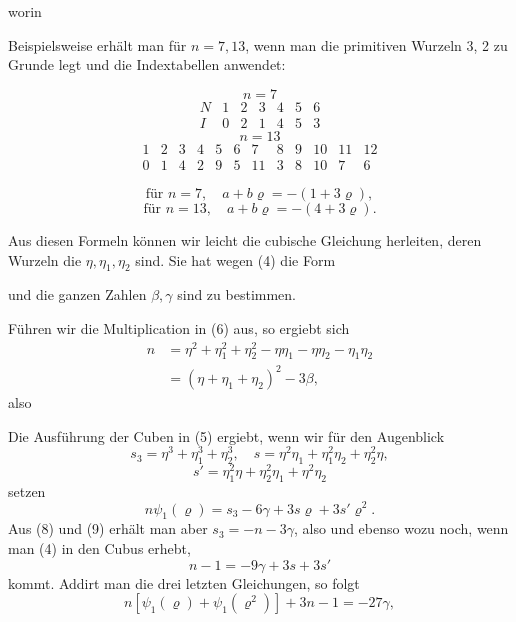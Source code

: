 worin


Beispielsweise erhält man für $n = 7, 13$, wenn man die
primitiven Wurzeln 3, 2 zu Grunde legt und die Indextabellen
anwendet:

\[
n = 7
\]
\[
\begin{array}{c|c|c|c|c|c|c}
N & 1 & 2 & 3 & 4 & 5 & 6 \\
\hline
I & 0 & 2 & 1 & 4 & 5 & 3
\end{array}
\]
\[
n = 13
\]
\[
\begin{array}{c|c|c|c|c|c|c|c|c|c|c|c}
1 & 2 & 3 & 4 & 5 & 6 & 7 & 8 & 9 & 10 & 11 & 12 \\
\hline
0 & 1 & 4 & 2 & 9 & 5 & 11 & 3 & 8 & 10 & 7 & 6
\end{array}
\]

\[
\text{für } n = 7, \quad a + b\varrho = -(1 + 3\varrho),
\]
\[
\text{für } n = 13, \quad a + b\varrho = -(4 + 3\varrho).
\]

Aus diesen Formeln können wir leicht die cubische Glei\-chung herleiten, deren Wurzeln die $\eta, \eta_1, \eta_2$ sind. Sie hat wegen
(4) die Form

und die ganzen Zahlen $\beta, \gamma$ sind zu bestimmen.

Führen wir die Multiplication in (6) aus, so ergiebt sich
\[
\begin{aligned}
n &= \eta^2 + \eta_1^2 + \eta_2^2 - \eta\eta_1 - \eta\eta_2 - \eta_1\eta_2 \\
  &= (\eta + \eta_1 + \eta_2)^2 - 3\beta,
\end{aligned}
\]
also

Die Ausführung der Cuben in (5) ergiebt, wenn wir für den
Augenblick
\[
s_3 = \eta^3 + \eta_1^3 + \eta_2^3, \quad s = \eta^2\eta_1 + \eta_1^2\eta_2 + \eta_2^2\eta,
\]
\[
s' = \eta_1^2\eta + \eta_2^2\eta_1 + \eta^2\eta_2
\]
setzen
\[
n\psi_1(\varrho) = s_3 - 6\gamma + 3s\varrho + 3s'\varrho^2.
\]
Aus (8) und (9) erhält man aber $s_3 = -n - 3\gamma$, also
und ebenso
wozu noch, wenn man (4) in den Cubus erhebt,
\[
n - 1 = -9\gamma + 3s + 3s'
\]
kommt. Addirt man die drei letzten Gleichungen, so folgt
\[
n[\psi_1(\varrho) + \psi_1(\varrho^2)] + 3n - 1 = -27\gamma,
\]
